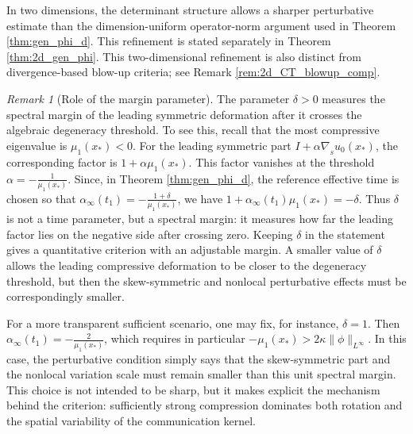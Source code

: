 \documentclass[11pt]{amsart}
\numberwithin{equation}{section}
\theoremstyle{definition}
\theoremstyle{remark}
\newtheorem{remark}[theorem]{Remark}
\numberwithin{equation}{section}
\newtheorem{remark}[theorem]{Remark}
\newcommand{\nabS}{\nabla_{\!\!{}_S}}
\begin{document}
In two dimensions, the determinant structure allows a sharper perturbative estimate than the dimension-uniform operator-norm argument used in Theorem \ref{thm:gen_phi_d}. This refinement is stated separately in Theorem \ref{thm:2d_gen_phi}. This two-dimensional refinement is also distinct from divergence-based blow-up criteria; see Remark \ref{rem:2d_CT_blowup_comp}.


\begin{remark}[Role of the margin parameter]
The parameter $\delta>0$ measures the spectral margin of the leading symmetric deformation after it crosses the algebraic degeneracy threshold. To see this, recall that the most compressive eigenvalue is $\mu_1(x_*)<0$. For the leading symmetric part $I+\alpha \nabS u_0(x_*)$, the corresponding factor is $1+\alpha\mu_1(x_*)$. This factor vanishes at the threshold $\alpha=-\frac1{\mu_1(x_*)}$. Since, in Theorem \ref{thm:gen_phi_d}, the reference effective time is chosen so that $\alpha_\infty(t_1)=-\frac{1+\delta}{\mu_1(x_*)}$, we have $1+\alpha_\infty(t_1)\mu_1(x_*)=-\delta$. Thus $\delta$ is not a time parameter, but a spectral margin: it measures how far the leading factor lies on the negative side after crossing zero. Keeping $\delta$ in the statement gives a quantitative criterion with an adjustable margin. A smaller value of $\delta$ allows the leading compressive deformation to be closer to the degeneracy threshold, but then the skew-symmetric and nonlocal perturbative effects must be correspondingly smaller.

For a more transparent sufficient scenario, one may fix, for instance, $\delta=1$. Then $\alpha_\infty(t_1) =-\frac{2}{\mu_1(x_*)}$, which requires in particular $ -\mu_1(x_*)>2\kappa\|\phi\|_{L^\infty}$. In this case, the perturbative condition simply says that the skew-symmetric part and the nonlocal variation scale must remain smaller than this unit spectral margin. This choice is not intended to be sharp, but it makes explicit the mechanism behind the criterion: sufficiently strong compression dominates both rotation and the spatial variability of the communication kernel.
\end{remark}
 
\end{document}
